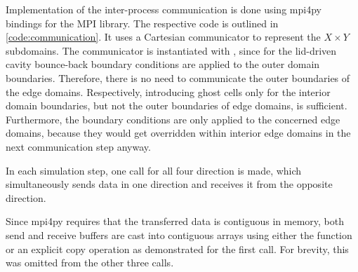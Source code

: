 Implementation of the inter-process communication is done using mpi4py bindings for the \gls{MPI} library. The respective code is outlined in \cref{code:communication}. It uses a Cartesian communicator to represent the $X \times Y$ subdomains. The communicator is instantiated with , since for the lid-driven cavity bounce-back boundary conditions are applied to the outer domain boundaries. Therefore, there is no need to communicate the outer boundaries of the edge domains. Respectively, introducing ghost cells only for the interior domain boundaries, but not the outer boundaries of edge domains, is sufficient. Furthermore, the boundary conditions are only applied to the concerned edge domains, because they would get overridden within interior edge domains in the next communication step anyway.

In each simulation step, one  call for all four direction is made, which simultaneously sends data in one direction and receives it from the opposite direction.

Since mpi4py requires that the transferred data is contiguous in memory, both send and receive buffers are cast into contiguous arrays using either the  function or an explicit copy operation as demonstrated for the first  call. For brevity, this was omitted from the other three  calls.
